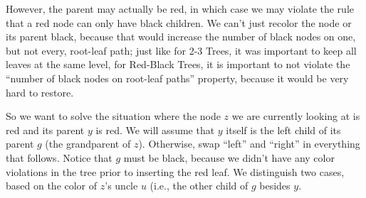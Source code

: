 However, the parent may actually be red, in which case we may violate
the rule that a red node can only have black children.
We can't just recolor the node or its parent black, because that would
increase the number of black nodes on one, but not every, root-leaf
path; just like for 2-3 Trees, it was important to keep all leaves at
the same level, for Red-Black Trees, it is important to not violate
the ``number of black nodes on root-leaf paths'' property, because it
would be very hard to restore.

So we want to solve the situation where the node $z$ we are currently
looking at is red and its parent $y$ is red. We will assume that $y$
itself is the left child of its parent $g$ (the grandparent of $z$).
Otherwise, swap ``left'' and ``right'' in everything that follows.
Notice that $g$ must be black, because we didn't have any color violations
in the tree prior to inserting the red leaf.
We distinguish two cases, based on the color of $z$'s uncle $u$ (i.e.,
the other child of $g$ besides $y$.

